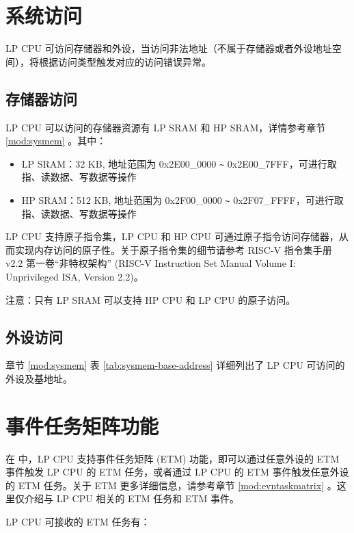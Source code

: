 \documentclass[main\_\_CN.tex]{subfiles}
\begin{document}
\section{系统访问}

LP CPU 可访问存储器和外设，当访问非法地址（不属于存储器或者外设地址空间），将根据访问类型触发对应的访问错误异常。

\subsection{存储器访问}

\chipname{} LP CPU 可以访问的存储器资源有 LP SRAM 和 HP SRAM，详情参考章节 \ref{mod:sysmem} \textit{}。其中：
\begin{itemize}
    \item LP SRAM：32 KB, 地址范围为 0x2E00\_0000 \verb+~+ 0x2E00\_7FFF，可进行取指、读数据、写数据等操作
    \item HP SRAM：512 KB, 地址范围为 0x2F00\_0000 \verb+~+ 0x2F07\_FFFF，可进行取指、读数据、写数据等操作
\end{itemize}


LP CPU 支持原子指令集，LP CPU 和 HP CPU 可通过原子指令访问存储器，从而实现内存访问的原子性。关于原子指令集的细节请参考 RISC-V 指令集手册 v2.2 第一卷“非特权架构” (RISC-V Instruction Set Manual Volume I: Unprivileged ISA, Version 2.2)。

注意：只有 LP SRAM 可以支持 HP CPU 和 LP CPU 的原子访问。

\subsection{外设访问}

章节 \ref{mod:sysmem} \textit{} 表 \ref{tab:sysmem-base-address} 详细列出了 LP CPU 可访问的外设及基地址。

\section{事件任务矩阵功能}
\label{sec:ulp-etm-func}

在 \chipname{} 中，LP CPU 支持事件任务矩阵 (ETM) 功能，即可以通过任意外设的 ETM 事件触发 LP CPU 的 ETM 任务，或者通过 LP CPU 的 ETM 事件触发任意外设的 ETM 任务。关于 ETM 更多详细信息，请参考章节 \ref{mod:evntaskmatrix} 。这里仅介绍与 LP CPU 相关的 ETM 任务和 ETM 事件。

LP CPU 可接收的 ETM 任务有：
\end{document}
